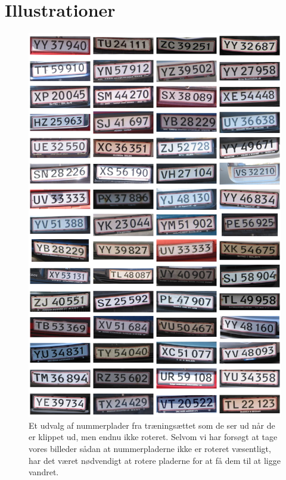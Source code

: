 \documentclass[11pt,a4paper,final]{article}
\begin{document}
\appendix
\setcounter{footnote}{0}


\newpage
\section{Illustrationer}
\label{sec:illu}
\begin{figure}[htp]
\centering
\includegraphics[width=12cm]{appendix/illu/plates_not_rotated-1.jpg} 
\caption{Et udvalg af nummerplader fra træningsættet som de ser ud når de er klippet ud, men endnu ikke roteret. Selvom vi har forsøgt at tage vores billeder sådan at nummerpladerne ikke er roteret væsentligt, har det været nødvendigt at rotere pladerne for at få dem til at ligge vandret.}
\label{fig:illu:plates_not_rotated-1}
\end{figure}
\end{document}
